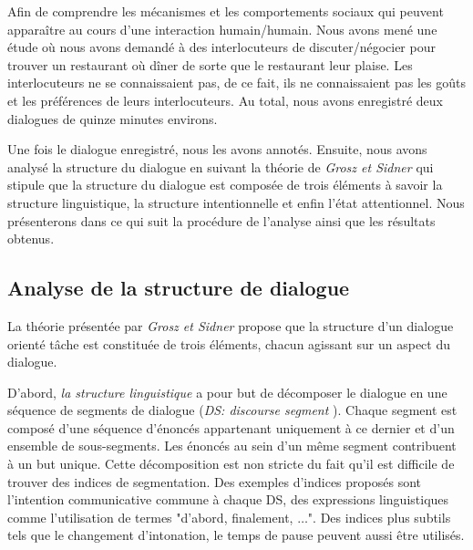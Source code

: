 
Afin de comprendre les mécanismes et  les comportements sociaux qui peuvent apparaître au cours d'une interaction humain/humain.
Nous avons mené une étude où nous avons demandé à des interlocuteurs de discuter/négocier pour trouver un restaurant où dîner de sorte que le restaurant leur plaise.
Les interlocuteurs ne se connaissaient pas, de ce fait, ils ne connaissaient pas les goûts et les préférences de leurs interlocuteurs. Au total, nous avons enregistré deux dialogues de quinze minutes environs.

Une fois le dialogue enregistré, nous les avons annotés. Ensuite, nous avons analysé la structure du dialogue en suivant la théorie de \emph{Grosz et Sidner} \cite{sidner1994artificial} qui stipule que la structure du dialogue est composée de trois éléments à savoir la structure linguistique, la structure intentionnelle et enfin l'état attentionnel.	
Nous présenterons dans ce qui suit la procédure de l'analyse ainsi que les résultats obtenus. 

\subsection{Analyse de la structure de dialogue}  
La théorie présentée par \emph{Grosz et Sidner} propose que la structure d'un dialogue orienté tâche est constituée de trois éléments, chacun agissant sur un aspect du dialogue. 

D'abord, \emph{la structure linguistique} a pour but de décomposer le dialogue en une séquence de segments de dialogue (\textit{DS: discourse segment }). Chaque segment est composé d'une séquence d'énoncés appartenant uniquement à ce dernier et d'un ensemble de sous-segments. Les énoncés au sein d'un même segment contribuent à un but unique. Cette décomposition est non stricte du fait qu'il est difficile de trouver des indices de segmentation. Des exemples d'indices proposés sont l'intention communicative commune à chaque DS, des expressions  linguistiques comme l'utilisation de termes "d'abord, finalement, $\ldots$". Des indices plus subtils tels que le changement d'intonation, le temps de pause peuvent aussi être utilisés.

